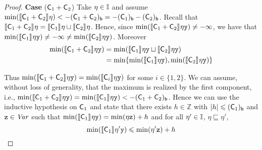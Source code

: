 \begin{proof}
    
  
  
  \medskip
  
  \noindent
  \textbf{Case} (\(\com_1 \ndet \com_2\))
  Take \(\eta \in \inte\) and assume
  \(\min(\semi{\com_1 \ndet \com_2}\eta) < -\lbound{\com_1 \ndet \com_2}
  = - \lbound{\com_1} - \lbound{\com_2}\).  Recall that
  \(\semi{\com_1 \ndet \com_2} \eta = \semi{\com_1}\eta \sqcup
  \semi{\com_2}\eta\).
  Hence, since
  \(\min(\semi{\com_1 \ndet \com_2} \eta \var[y]) \neq -\infty\), we
  have that
  \(\min(\semi{\com_1} \eta \var[y]) \neq -\infty \neq
  \min(\semi{\com_2}\eta \var[y])\).  Moreover
  \begin{align*}
    \min(\semi{\com_1 \ndet \com_2}\eta \var[y])& =  \min(\semi{\com_1}\eta \var[y] \sqcup \semi{\com_2}\eta \var[y]) \\ 
    & = \min \{ \min(\semi{\com_1}\eta \var[y]), \min(\semi{\com_2}\eta \var[y])\} %
  \end{align*}

  Thus
  \(\min(\semi{\com_1 \ndet \com_2}\eta \var[y]) =
  \min(\semi{\com_i}\eta \var[y])\) for some \(i \in \{1,2\}\). We can
  assume, without loss of generality, that the maximum is realized by
  the first component, i.e.,
  \(\min(\semi{\com_1 \ndet \com_2}\eta \var[y]) =
  \min(\semi{\com_1}\eta \var[y]) < -\lbound{\com_1 \ndet
    \com_2}\). Hence we can use the inductive hypothesis on \(\com_1\)
  and state that there exists \(h \in \mathbb{Z}\) with
  \(|h| \leq \lbound{\com_1}\) and \(\var[z] \in \Var\) such that
  \(\min(\semi{\com_1}\eta \var[y]) = \min(\eta \var[z]) + h\) and for
  all \(\eta' \in \inte\), \(\eta \sqsubseteq \eta'\),
  \[
  \min(\semi{\com_1}\eta' \var[y]) \leq \min(\eta' \var[z]) + h
  \]


\end{proof}

